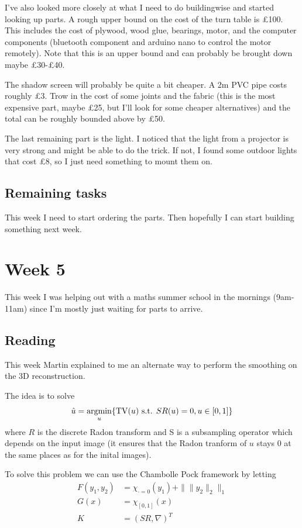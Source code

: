 \documentclass[a4paper]{article}
\begin{document}
I've also looked more closely at what I need to do buildingwise and started looking up parts. A rough upper bound on the cost of the turn table is \pounds 100. This includes the cost of plywood, wood glue, bearings, motor, and the computer components (bluetooth component and arduino nano to control the motor remotely). 
Note that this is an upper bound and can probably be brought down maybe \pounds 30-\pounds 40.

The shadow screen will probably be quite a bit cheaper. A 2m PVC pipe costs roughly \pounds 3. Trow in the cost of some joints and the fabric (this is the most expensive part, maybe \pounds 25, but I'll look for some cheaper alternatives) and the total can be roughly bounded above by \pounds 50.

The last remaining part is the light. I noticed that the light from a projector is very strong and might be able to do the trick. If not, I found some outdoor lights that cost \pounds 8, so I just need something to mount them on.

\subsection{Remaining tasks}
This week I need to start ordering the parts. Then hopefully I can start building something next week.

\section{Week 5}
This week I was helping out with a maths summer school in the mornings (9am-11am) since I'm mostly just waiting for parts to arrive.

\subsection{Reading}
This week Martin explained to me an alternate way to perform the smoothing on the 3D reconstruction.

The idea is to solve
\begin{equation}
    \hat u = \argmin_u \{\text{TV}(u) \text{ s.t. } SR(u)=0, u\in[0,1]\}
\end{equation}
where $R$ is the discrete Radon transform and S is a subsampling operator which depends on the input image (it ensures that the Radon tranform of $u$ stays 0 at the same places as for the inital images).

To solve this problem we can use the Chambolle Pock framework by letting 
\begin{align*}
    F(y_1,y_2) &= \chi_{\cdot = 0}(y_1)+\|\|y_2\|_2\|_1 \\
    G(x) &= \chi_{[0,1]}(x) \\
    K &= (SR,\nabla)^T
\end{align*}
\end{document}
